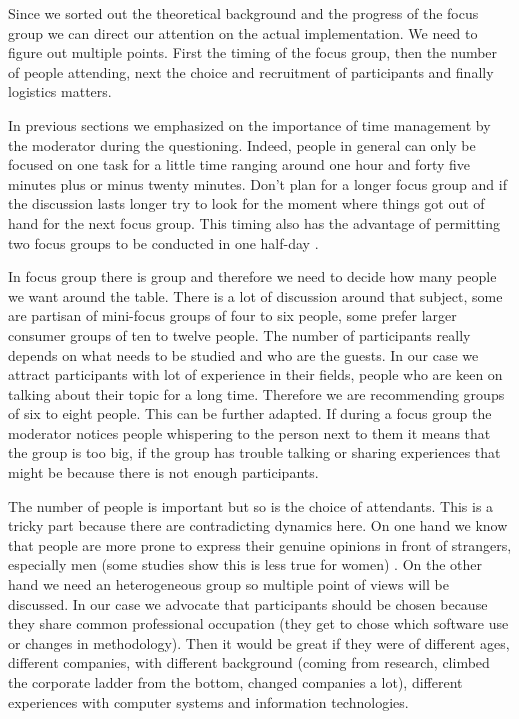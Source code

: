 \documentclass[10pt]{report}
\begin{document}
Since we sorted out the theoretical background and the progress of the focus group we can direct our attention on the actual implementation. We need to figure out multiple points. First the timing of the focus group, then the number of people attending, next the choice and recruitment of participants and finally logistics matters.

In previous sections we emphasized on the importance of time management by the moderator during the questioning. Indeed, people in general can only be focused on one task for a little time ranging around one hour and forty five minutes plus or minus twenty minutes. Don't plan for a longer focus group and if the discussion lasts longer try to look for the moment where things got out of hand for the next focus group. This timing also has the advantage of permitting two focus groups to be conducted in one half-day \autocite{belk2007handbook}.

In focus group there is group and therefore we need to decide how many people we want around the table. There is a lot of discussion around that subject, some are partisan of mini-focus groups of four to six people, some prefer larger consumer groups of ten to twelve people. The number of participants really depends on what needs to be studied and who are the guests. In our case we attract participants with lot of experience in their fields, people who are keen on talking about their topic for a long time. Therefore we are recommending groups of six to eight people. This can be further adapted. If during a focus group the moderator notices people whispering to the person next to them it means that the group is too big, if the group has trouble talking or sharing experiences that might be because there is not enough participants.

The number of people is important but so is the choice of attendants. This is a tricky part because there are contradicting dynamics here. On one hand we know that people are more prone to express their genuine opinions in front of strangers, especially men (some studies show this is less true for women) \autocite{belk2007handbook}. On the other hand we need an heterogeneous group so multiple point of views will be discussed. In our case we advocate that participants should be chosen because they share common professional occupation (they get to chose which software use or changes in methodology). Then it would be great if they were of different ages, different companies, with different background (coming from research, climbed the corporate ladder from the bottom, changed companies a lot), different experiences with computer systems and information technologies.
\end{document}
